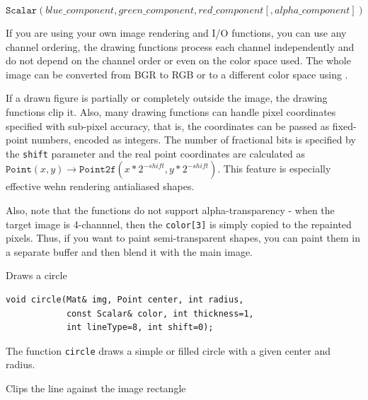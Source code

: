 \[\texttt{Scalar}(blue\_component, green\_component, red\_component[, alpha\_component])\]

If you are using your own image rendering and I/O functions, you can use any channel ordering, the drawing functions process each channel independently and do not depend on the channel order or even on the color space used. The whole image can be converted from BGR to RGB or to a different color space using .

If a drawn figure is partially or completely outside the image, the drawing functions clip it. Also, many drawing functions can handle pixel coordinates specified with sub-pixel accuracy, that is, the coordinates can be passed as fixed-point numbers, encoded as integers. The number of fractional bits is specified by the \texttt{shift} parameter and the real point coordinates are calculated as $\texttt{Point}(x,y)\rightarrow\texttt{Point2f}(x*2^{-shift},y*2^{-shift})$. This feature is especially effective wehn rendering antialiased shapes.

Also, note that the functions do not support alpha-transparency - when the target image is 4-channnel, then the \texttt{color[3]} is simply copied to the repainted pixels. Thus, if you want to paint semi-transparent shapes, you can paint them in a separate buffer and then blend it with the main image.

\label{circle}
Draws a circle

\begin{lstlisting}
void circle(Mat& img, Point center, int radius,
            const Scalar& color, int thickness=1,
            int lineType=8, int shift=0);
\end{lstlisting}
\begin{description}
\end{description}

The function \texttt{circle} draws a simple or filled circle with a
given center and radius.

\label{clipLine}
Clips the line against the image rectangle

